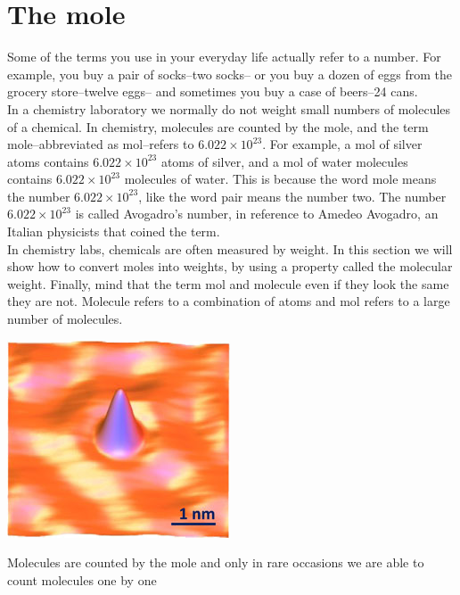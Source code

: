 \documentclass[main.tex]{subfiles}
\begin{document}
\section{The mole}
Some of the terms you use in your everyday life actually refer to a number. For example, you buy a pair of socks--two socks-- or you buy a dozen of eggs from the grocery store--twelve eggs-- and sometimes you buy a case of beers--24 cans. \\
In a chemistry laboratory we normally do not weight small numbers of molecules of a chemical. In chemistry, molecules are counted by the mole, and the term mole--abbreviated as mol--refers to $6.022\times 10^{23}$. For example, a mol of silver atoms contains $6.022\times 10^{23}$ atoms of silver, and a mol of water molecules contains $6.022\times 10^{23}$ molecules of water. This is because the word mole means the number $6.022\times 10^{23}$, like the word pair means the number two. The number $6.022\times 10^{23}$ is called Avogadro's number, in reference to Amedeo Avogadro, an Italian physicists that coined the term. \\
In chemistry labs, chemicals are often measured by weight. In this section we will show how to convert moles into weights, by using a property called the molecular weight. Finally, mind that the term mol and molecule even if they look the same they are not. Molecule refers to a combination of atoms and mol refers to a large number of molecules.
\sloppy 
\begin{marginfigure}[-1cm]%
      \includegraphics{chapter7/figure3}
      \label{fig:marginfig}
      \caption{Molecules are counted by the mole and only in rare occasions we are able to count molecules one by one}
	\end{marginfigure}%
\end{document}

